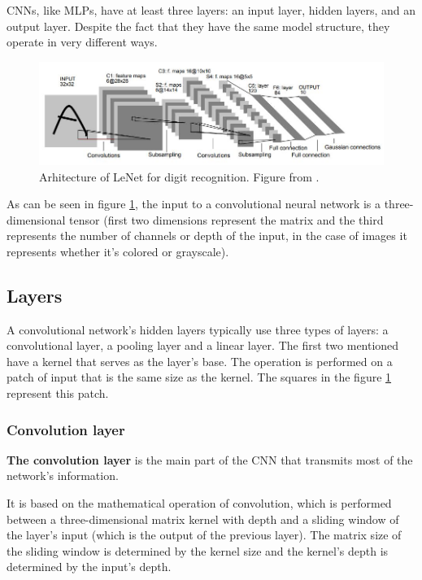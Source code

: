 \documentclass{report}[12pt, a4paper]
\begin{document}
CNNs, like MLPs, have at least three layers: an input layer, hidden layers, and an output layer. Despite the fact that they have the same model structure, they operate in very different ways.

\begin{figure}[htp]
    \centering
    \includegraphics[width=14cm]{lenet_diagram_paper}
    \caption{Arhitecture of LeNet for digit recognition. Figure from \cite{lenet_paper}.}
    \label{fig:lenet_diagram_paper}
\end{figure}

As can be seen in figure \ref{fig:lenet_diagram_paper}, the input to a convolutional neural network is a three-dimensional tensor (first two dimensions represent the matrix and the third represents the number of channels or depth of the input, in the case of images it represents whether it's colored or grayscale).

\subsection{Layers}

A convolutional network's hidden layers typically use three types of layers: a convolutional layer, a pooling layer and a linear layer. The first two mentioned have a kernel that serves as the layer's base. The operation is performed on a patch of input that is the same size as the kernel. The squares in the figure \ref{fig:lenet_diagram_paper} represent this patch.

\subsubsection{Convolution layer}

\textbf{The convolution layer} is the main part of the CNN that transmits most of the network's information.

It is based on the mathematical operation of convolution, which is performed between a three-dimensional matrix kernel with depth and a sliding window of the layer's input (which is the output of the previous layer). The matrix size of the sliding window is determined by the kernel size and the kernel's depth is determined by the input's depth.
\end{document}
